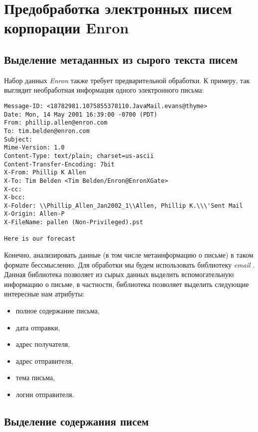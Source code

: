\section{Предобработка электронных писем корпорации Enron}

\subsection{Выделение метаданных из сырого текста писем}

Набор данных \textit{Enron} также требует предварительной обработки. К примеру, так выглядит необработная информация одного электронного письма:

\begin{verbatim}
Message-ID: <18782981.1075855378110.JavaMail.evans@thyme>
Date: Mon, 14 May 2001 16:39:00 -0700 (PDT)
From: phillip.allen@enron.com
To: tim.belden@enron.com
Subject: 
Mime-Version: 1.0
Content-Type: text/plain; charset=us-ascii
Content-Transfer-Encoding: 7bit
X-From: Phillip K Allen
X-To: Tim Belden <Tim Belden/Enron@EnronXGate>
X-cc: 
X-bcc: 
X-Folder: \\Phillip_Allen_Jan2002_1\\Allen, Phillip K.\\\'Sent Mail
X-Origin: Allen-P
X-FileName: pallen (Non-Privileged).pst

Here is our forecast
\end{verbatim}

Конечно, анализировать данные (в том числе метаинформацию о письме) в таком формате бессмысленно. Для обработки мы будем использовать библиотеку \textit{email} \cite{bib8}. Данная библиотека позволяет из сырых данных выделить вспомогательную информацию о письме, в частности, библиотека позволяет выделить следующие интересные нам атрибуты:
\begin{itemize}
\item полное содержание письма,
\item дата отправки,
\item адрес получателя,
\item адрес отправителя,
\item тема письма,
\item логин отправителя.
\end{itemize}

\subsection{Выделение содержания писем}

